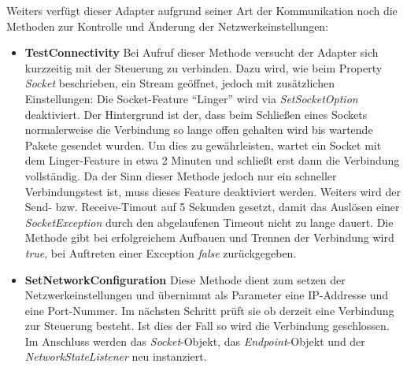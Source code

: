 Weiters verfügt dieser Adapter aufgrund seiner Art der Kommunikation noch die Methoden zur Kontrolle und Änderung der Netzwerkeinstellungen:
\begin{itemize}
\item \textbf{TestConnectivity}
\newline
 Bei Aufruf dieser Methode versucht der Adapter sich kurzzeitig mit der Steuerung zu verbinden. Dazu wird, wie beim Property \textit{Socket} beschrieben, ein Stream geöffnet, jedoch mit zusätzlichen Einstellungen: Die Socket-Feature “Linger” wird via \textit{SetSocketOption} deaktiviert. Der Hintergrund ist der, dass beim Schließen eines Sockets normalerweise die Verbindung so lange offen gehalten wird bis wartende Pakete gesendet wurden. Um dies zu gewährleisten, wartet ein Socket mit dem Linger-Feature in etwa 2 Minuten und schließt erst dann die Verbindung vollständig. Da der Sinn dieser Methode jedoch nur ein schneller Verbindungstest ist, muss dieses Feature deaktiviert werden. Weiters wird der Send- bzw. Receive-Timout auf 5 Sekunden gesetzt, damit das Auslösen einer \textit{SocketException} durch den abgelaufenen Timeout nicht zu lange dauert. Die Methode gibt bei erfolgreichem Aufbauen und Trennen der Verbindung wird \textit{true}, bei Auftreten einer Exception \textit{false} zurückgegeben.
\item \textbf{SetNetworkConfiguration}
\newline
Diese Methode dient zum setzen der Netzwerkeinstellungen und übernimmt als Parameter eine IP-Addresse und eine Port-Nummer. Im nächsten Schritt prüft sie ob derzeit eine Verbindung zur Steuerung besteht. Ist dies der Fall so wird die Verbindung geschlossen. Im Anschluss werden das \textit{Socket}-Objekt, das \textit{Endpoint}-Objekt und der \textit{NetworkStateListener} neu instanziert.
\end{itemize}

